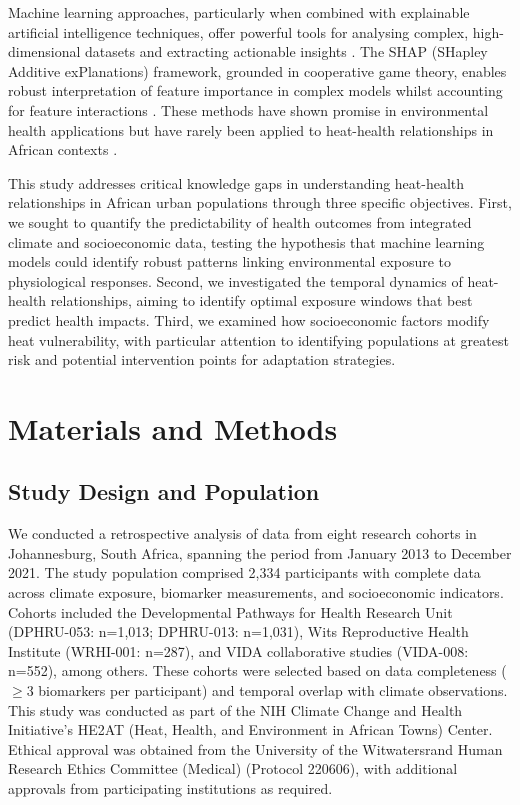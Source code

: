 \documentclass[11pt,a4paper]{article}
\begin{document}
Machine learning approaches, particularly when combined with explainable artificial intelligence techniques, offer powerful tools for analysing complex, high-dimensional datasets and extracting actionable insights \citep{Rajkomar2019, Beam2021}. The SHAP (SHapley Additive exPlanations) framework, grounded in cooperative game theory, enables robust interpretation of feature importance in complex models whilst accounting for feature interactions \citep{Lundberg2017, Lundberg2020}. These methods have shown promise in environmental health applications but have rarely been applied to heat-health relationships in African contexts \citep{Nori2019, Chen2022}.

This study addresses critical knowledge gaps in understanding heat-health relationships in African urban populations through three specific objectives. First, we sought to quantify the predictability of health outcomes from integrated climate and socioeconomic data, testing the hypothesis that machine learning models could identify robust patterns linking environmental exposure to physiological responses. Second, we investigated the temporal dynamics of heat-health relationships, aiming to identify optimal exposure windows that best predict health impacts. Third, we examined how socioeconomic factors modify heat vulnerability, with particular attention to identifying populations at greatest risk and potential intervention points for adaptation strategies.

\section{Materials and Methods}

\subsection{Study Design and Population}

We conducted a retrospective analysis of data from eight research cohorts in Johannesburg, South Africa, spanning the period from January 2013 to December 2021. The study population comprised 2,334 participants with complete data across climate exposure, biomarker measurements, and socioeconomic indicators. Cohorts included the Developmental Pathways for Health Research Unit (DPHRU-053: n=1,013; DPHRU-013: n=1,031), Wits Reproductive Health Institute (WRHI-001: n=287), and VIDA collaborative studies (VIDA-008: n=552), among others. These cohorts were selected based on data completeness ($\geq$3 biomarkers per participant) and temporal overlap with climate observations. This study was conducted as part of the NIH Climate Change and Health Initiative's HE2AT (Heat, Health, and Environment in African Towns) Center. Ethical approval was obtained from the University of the Witwatersrand Human Research Ethics Committee (Medical) (Protocol 220606), with additional approvals from participating institutions as required.
\end{document}
